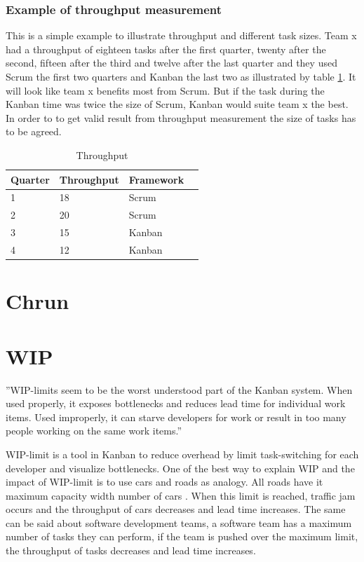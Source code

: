 \documentclass[UKenglish]{ifimaster}  %
\begin{document}
\subsubsection{Example of throughput measurement}
This is a simple example to illustrate throughput and different task sizes. Team x had a throughput of eighteen tasks after the first quarter, twenty after the second, fifteen after the third and twelve after the last quarter and they used Scrum the first two quarters and Kanban the last two as illustrated by table \ref{tt}. It will look like team x benefits most from Scrum. But if the task during the Kanban time was twice the size of Scrum, Kanban would suite team x the best. In order to to get valid result from throughput measurement the size of tasks has to be agreed. 
\begin{table}[ht]
\begin{center}
    \begin{tabular}{| l | l | l | l |}
    \hline
    Quarter & Throughput &  Framework\\ \hline
    1 & 18 & Scrum\\ \hline
    2 & 20 & Scrum \\ \hline
    3 & 15 & Kanban\\ \hline
    4 & 12 & Kanban\\ \hline
    \end{tabular}
\caption{Throughput}
\label{tt} %
\end{center}
\end{table}

\section{Chrun}

\section{WIP}
''WIP-limits seem to be the worst understood part of the Kanban system. When used properly, it exposes bottlenecks and reduces lead time for individual work items. Used improperly, it can starve developers for work or result in too many people working on the same work items.'' \parencite{Shinkle}


WIP-limit is a tool in Kanban to reduce overhead by limit task-switching for each developer and visualize bottlenecks. One of the best way to explain WIP and the impact of WIP-limit is to use cars and roads as analogy. All roads have it maximum capacity width number of cars . When this limit is reached, traffic jam occurs and the throughput of cars decreases and lead time increases. The same can be said about software development teams, a software team has a maximum number of tasks they can perform, if the team is pushed over the maximum limit, the throughput of tasks decreases and lead time increases.
\end{document}
